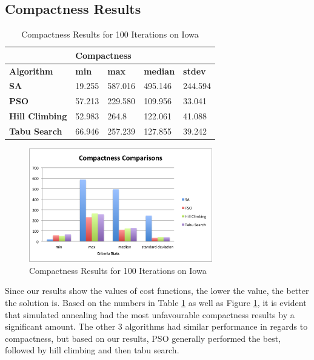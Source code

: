 \documentclass[journal]{IEEEtran}
\begin{document}
\subsection{Compactness Results}

\begin{table}[!h]
\centering
\caption{Compactness Results for 100 Iterations on Iowa}
\label{tab:comp_100iter}
\begin{tabular}{l|llll}
                       & \multicolumn{4}{l}{\textbf{Compactness}}                      \\ \hline
\textbf{Algorithm}     & \textbf{min} & \textbf{max} & \textbf{median} & \textbf{stdev} \\ \hline
\textbf{SA}            & 19.255       & 587.016      & 495.146         & 244.594       \\
\textbf{PSO}           & 57.213       & 229.580      & 109.956         & 33.041         \\
\textbf{Hill Climbing} & 52.983       & 264.8        & 122.061         & 41.088         \\
\textbf{Tabu Search}   & 66.946       & 257.239      & 127.855         & 39.242            
\end{tabular}
\end{table}

\begin{figure}[h!]
    \includegraphics[width=8cm]{images/compactness_graph.png}
    \centering
    \caption{Compactness Results for 100 Iterations on Iowa}
    \label{fig:compactness_results}
\end{figure}

Since our results show the values of cost functions, the lower the value, the better the solution is. Based on the numbers in Table \ref{tab:comp_100iter} as well as Figure \ref{fig:compactness_results}, it is evident that simulated annealing had the most unfavourable compactness results by a significant amount. The other 3 algorithms had similar performance in regards to compactness, but based on our results, PSO generally performed the best, followed by hill climbing and then tabu search. 
\end{document}
